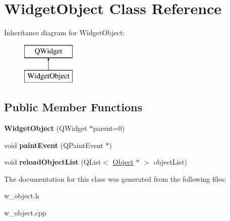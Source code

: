 \hypertarget{class_widget_object}{}\section{Widget\+Object Class Reference}
\label{class_widget_object}
Inheritance diagram for Widget\+Object\+:\begin{figure}[H]
\begin{center}
\leavevmode
\includegraphics[height=2.000000cm]{class_widget_object}
\end{center}
\end{figure}
\subsection*{Public Member Functions}
\begin{DoxyCompactItemize}
\item 
\hypertarget{class_widget_object_a9afd6dc40c5f86a62260aab7da90240d}{}{\bfseries Widget\+Object} (Q\+Widget $\ast$parent=0)\label{class_widget_object_a9afd6dc40c5f86a62260aab7da90240d}

\item 
\hypertarget{class_widget_object_a60fa184f747fa815ff6b1604b16dfb01}{}void {\bfseries paint\+Event} (Q\+Paint\+Event $\ast$)\label{class_widget_object_a60fa184f747fa815ff6b1604b16dfb01}

\item 
\hypertarget{class_widget_object_ab94d05b6395226aa5e06a6a551c0ee47}{}void {\bfseries reload\+Object\+List} (Q\+List$<$ \hyperlink{class_object}{Object} $\ast$ $>$ object\+List)\label{class_widget_object_ab94d05b6395226aa5e06a6a551c0ee47}

\end{DoxyCompactItemize}


The documentation for this class was generated from the following files\+:\begin{DoxyCompactItemize}
\item 
w\+\_\+object.\+h\item 
w\+\_\+object.\+cpp\end{DoxyCompactItemize}
